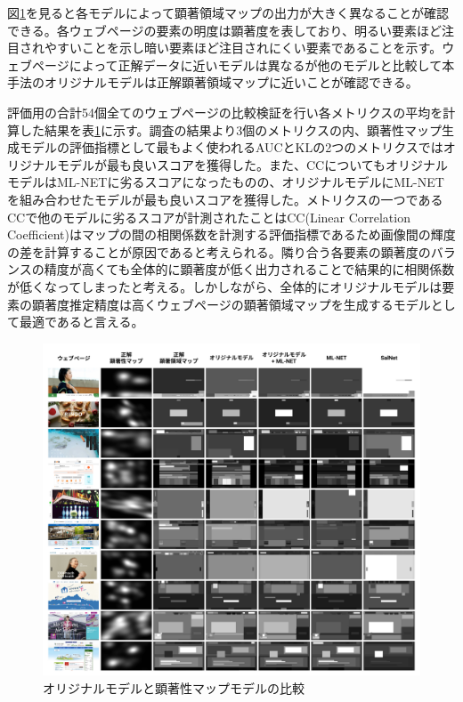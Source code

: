 \par 図\ref{fig_07_eval-models}を見ると各モデルによって顕著領域マップの出力が大きく異なることが確認できる。各ウェブページの要素の明度は顕著度を表しており、明るい要素ほど注目されやすいことを示し暗い要素ほど注目されにくい要素であることを示す。ウェブページによって正解データに近いモデルは異なるが他のモデルと比較して本手法のオリジナルモデルは正解顕著領域マップに近いことが確認できる。

\par 評価用の合計54個全てのウェブページの比較検証を行い各メトリクスの平均を計算した結果を表\ref{fig_07_eval-models}に示す。調査の結果より3個のメトリクスの内、顕著性マップ生成モデルの評価指標として最もよく使われるAUCとKLの2つのメトリクスではオリジナルモデルが最も良いスコアを獲得した。また、CCについてもオリジナルモデルはML-NETに劣るスコアになったものの、オリジナルモデルにML-NETを組み合わせたモデルが最も良いスコアを獲得した。メトリクスの一つであるCCで他のモデルに劣るスコアが計測されたことはCC(Linear Correlation Coefficient)はマップの間の相関係数を計測する評価指標であるため画像間の輝度の差を計算することが原因であると考えられる。隣り合う各要素の顕著度のバランスの精度が高くても全体的に顕著度が低く出力されることで結果的に相関係数が低くなってしまったと考える。しかしながら、全体的にオリジナルモデルは要素の顕著度推定精度は高くウェブページの顕著領域マップを生成するモデルとして最適であると言える。


\begin{figure}[H]
  \centering
  \includegraphics[width=12.5cm]{figures/07_eval-models.jpg}
  \caption{オリジナルモデルと顕著性マップモデルの比較}
  \label{fig_07_eval-models}
\end{figure}

